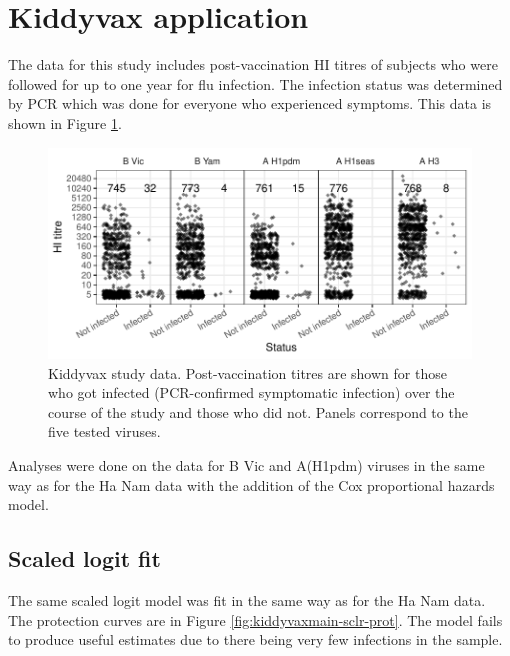\documentclass[12pt]{article}
\begin{document}
\pagebreak
\section{Kiddyvax application}

The data for this study includes post-vaccination HI titres of subjects who were followed for up to one year for flu infection. The infection status was determined by PCR which was done for everyone who experienced symptoms. This data is shown in Figure \ref{fig:kiddyvax-main-titre}.

\begin{figure}[htp]
	\centering
	\includegraphics[width=1\textwidth]{../data-plot/kiddyvax-main-titre.pdf}
	\caption{
	Kiddyvax study data. Post-vaccination titres are shown for those who got infected (PCR-confirmed symptomatic infection) over the course of the study and those who did not. Panels correspond to the five tested viruses.
	}
	\label{fig:kiddyvax-main-titre}
\end{figure}

Analyses were done on the data for B Vic and A(H1pdm) viruses in the same way as for the Ha Nam data with the addition of the Cox proportional hazards model.

%
\subsection{Scaled logit fit}

The same scaled logit model was fit in the same way as for the Ha Nam data. The protection curves are in Figure \ref{fig:kiddyvaxmain-sclr-prot}. The model fails to produce useful estimates due to there being very few infections in the sample.
\end{document}
